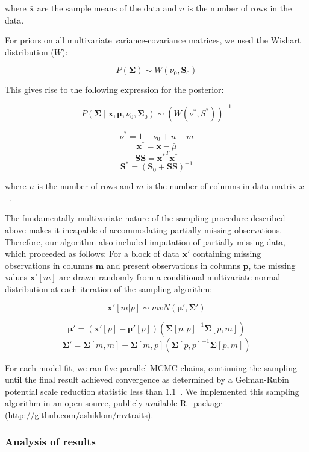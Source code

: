 where ${\bar{{\mathbf{x}}}}$ are the sample means of the data and $n$ is the number of rows in the data.

For priors on all multivariate variance-covariance matrices, we used the Wishart distribution ($W$):

\[P(\mathbf{\Sigma}) \sim W(\nu_0, \mathbf{S}_0)\]

This gives rise to the following expression for the posterior:

\[P(\mathbf{\Sigma} \mid
  \mathbf{x}, \mathbf{\mu},
  \nu_0, \mathbf{\Sigma}_0)
  \sim
  {(W(\nu^*, S^*))}^{-1}\]

\[\nu^* = 1 + \nu_0 + n + m\]
\[\mathbf{x^*} = \mathbf{x} - \bar{\mu}\]
\[\mathbf{SS} = \mathbf{x^*}^{T} \mathbf{x^*}\]
\[\mathbf{S^*} = {(\mathbf{S}_0 + \mathbf{SS})}^{-1}\]

where $n$ is the number of rows and $m$ is the number of columns in data matrix $x$~\cite[full derivation in ]{gelman_bayesian}. %

The fundamentally multivariate nature of the sampling procedure described above makes it incapable of accommodating partially missing observations.
Therefore, our algorithm also included imputation of partially missing data, which proceeded as follows:
For a block of data $\mathbf{x'}$ containing missing observations in columns $\mathbf{m}$ and present observations in columns $\mathbf{p}$,
the missing values $\mathbf{x'}[m]$ are drawn randomly from a conditional multivariate normal distribution at each iteration of the sampling algorithm:

\[\mathbf{x'}[m|p] \sim mvN(\mathbf{\mu}', \mathbf{\Sigma}')\]

\[\mathbf{\mu'} = 
  (\mathbf{x'}[p] - \mathbf{\mu'}[p]) 
  ({\mathbf{\Sigma}[p,p]}^{-1} \mathbf{\Sigma}[p,m])\]
\[\mathbf{\Sigma'} = \mathbf{\Sigma}[m,m] - 
  \mathbf{\Sigma}[m,p]
  ({\mathbf{\Sigma}[p,p]}^{-1} \mathbf{\Sigma}[p,m])\]

For each model fit, we ran five parallel MCMC chains, continuing the sampling until the final result achieved convergence as determined by a Gelman-Rubin potential scale reduction statistic less than 1.1~\cite{gelman_1992_inference}.
We implemented this sampling algorithm in an open source, publicly available R~\cite[version 3.4.3]{rstats} package (http://github.com/ashiklom/mvtraits).


\subsubsection{Analysis of results}

